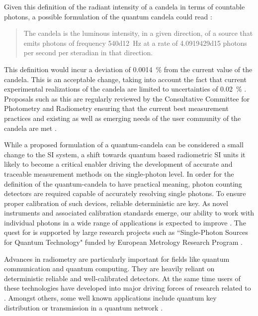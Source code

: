 	Given this definition of the radiant intensity of a candela in terms of countable photons, a possible formulation of the quantum candela could read \cite{Cheung2007}:

	\begin{quote}
		The candela is the luminous intensity, in a given direction, of a source that emits photons of frequency \SI{540d12}{\hertz} at a rate of \num{4.0919429d15} photons per second per steradian in that direction.
	\end{quote}

	This definition would incur a deviation of \SI{0.0014}{\percent} from the current value of the candela. This is an acceptable change, taking into account the fact that current experimental realizations of the candela are limited to uncertainties of \SI{0.02}{\percent} \cite{Cheung2007}. Proposals such as this are regularly reviewed by the Consultative Committee for Photometry and Radiometry ensuring that the current best measurement practices and existing as well as emerging needs of the user community of the candela are met \cite{zwinkels2010photometry}.

	While a proposed formulation of a quantum-candela can be considered a small change to the SI system, a shift towards quantum based radiometric SI units it likely to become a critical enabler driving the development of accurate and traceable measurement methods on the single-photon level. In order for the definition of the quantum-candela to have practical meaning, photon counting detectors are required capable of accurately resolving single photons. To ensure proper calibration of such devices, reliable deterministic \spss are key. As novel instruments and associated calibration standards emerge, our ability to work with individual photons in a wide range of applications is expected to improve \cite{buller2009single, eisaman2011invited, sangouard2012single, chunnilall2014metrology}. The quest for \spss is supported by large research projects such as ``Single-Photon Sources for Quantum Technology" funded by European Metrology Research Program \cite{SiquteProject,QuCandelaProject}.

	Advances in radiometry are particularly important for fields like quantum communication and quantum computing. They are heavily reliant on deterministic reliable \spss and well-calibrated detectors. At the same time users of these technologies have developed into major driving forces of research related to \spss \cite{scheel2009single, chunnilall2014metrology}. Amongst others, some well known applications include quantum key distribution \cite{bennett2014quantum, beveratos2002single, alleaume2004experimental} or transmission in a quantum network \cite{childress2006fault, bernien2012two, pfaff2014unconditional}.

